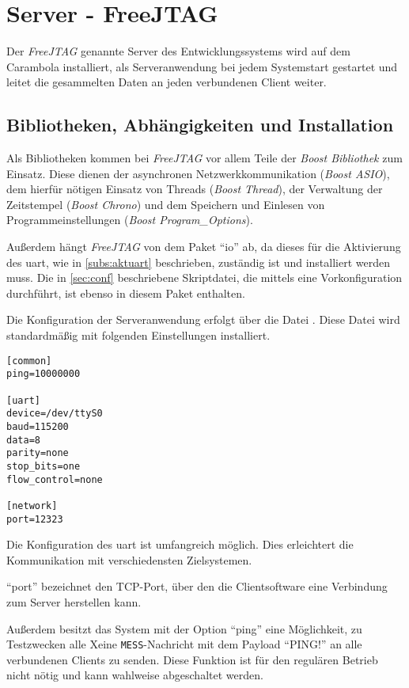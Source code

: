 \section{Server - FreeJTAG}
Der \emph{FreeJTAG} genannte Server des Entwicklungssystems wird auf dem
Carambola installiert, als Serveranwendung bei jedem Systemstart gestartet und leitet die
gesammelten Daten an jeden verbundenen Client weiter.

\subsection{Bibliotheken, Abhängigkeiten und Installation}
Als Bibliotheken kommen bei \emph{FreeJTAG} vor allem Teile der \emph{Boost Bibliothek}
zum Einsatz. Diese dienen der asynchronen Netzwerkkommunikation (\emph{Boost
ASIO}), dem hierfür nötigen Einsatz von Threads (\emph{Boost Thread}), der
Verwaltung der Zeitstempel (\emph{Boost Chrono}) und dem Speichern und
Einlesen von Programmeinstellungen (\emph{Boost Program\_Options}).

Außerdem hängt \emph{FreeJTAG} von dem Paket "`io"' ab, da dieses für die Aktivierung
des \gls{uart}, wie in \autoref{subs:aktuart} beschrieben, zuständig ist und
installiert werden muss. Die in \autoref{sec:conf} beschriebene Skriptdatei,
die mittels  eine Vorkonfiguration durchführt, ist
ebenso in diesem Paket enthalten.

Die Konfiguration der Serveranwendung erfolgt über die Datei
. Diese Datei wird standardmäßig mit folgenden
Einstellungen installiert.
\begin{lstlisting}
[common]
ping=10000000

[uart]
device=/dev/ttyS0
baud=115200
data=8
parity=none
stop_bits=one
flow_control=none

[network]
port=12323
\end{lstlisting}

Die Konfiguration des \gls{uart} ist umfangreich möglich. Dies erleichtert
die Kommunikation mit verschiedensten Zielsystemen.

"`port"' bezeichnet den TCP-Port, über den die Clientsoftware eine
Verbindung zum Server herstellen kann.

Außerdem besitzt das System mit der Option "`ping"' eine Möglichkeit, zu
Testzwecken alle X\us eine \texttt{MESS}-Nachricht mit dem Payload "`PING!"' an
alle verbundenen Clients zu senden. Diese Funktion ist für den regulären Betrieb
nicht nötig und kann wahlweise abgeschaltet werden.


